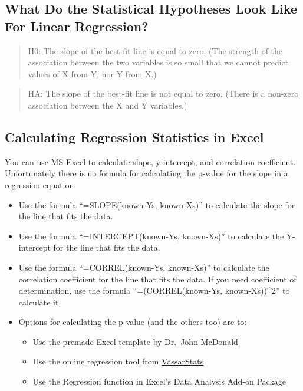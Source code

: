 \documentclass[
]{book}
\providecommand{\tightlist}{%
  \setlength{\itemsep}{0pt}\setlength{\parskip}{0pt}}
\begin{document}
\hypertarget{what-do-the-statistical-hypotheses-look-like-for-linear-regression}{%
\subsection{What Do the Statistical Hypotheses Look Like For Linear Regression?}\label{what-do-the-statistical-hypotheses-look-like-for-linear-regression}}

\begin{quote}
H0: The slope of the best-fit line is equal to zero. (The strength of the association between the two variables is so small that we cannot predict values of X from Y, nor Y from X.)
\end{quote}

\begin{quote}
HA: The slope of the best-fit line is not equal to zero. (There is a non-zero association between the X and Y variables.)
\end{quote}

\hypertarget{calculating-regression-statistics-in-excel}{%
\subsection{Calculating Regression Statistics in Excel}\label{calculating-regression-statistics-in-excel}}

You can use MS Excel to calculate slope, y-intercept, and correlation coefficient. Unfortunately there is no formula for calculating the p-value for the slope in a regression equation.

\begin{itemize}
\tightlist
\item
  Use the formula ``=SLOPE(known-Ys, known-Xs)'' to calculate the slope for the line that fits the data.
\item
  Use the formula ``=INTERCEPT(known-Ys, known-Xs)'' to calculate the Y-intercept for the line that fits the data.
\item
  Use the formula ``=CORREL(known-Ys, known-Xs)'' to calculate the correlation coefficient for the line that fits the data. If you need coefficient of determination, use the formula ``=(CORREL(known-Ys, known-Xs))\^{}2'' to calculate it.
\item
  Options for calculating the p-value (and the others too) are to:

  \begin{itemize}
  \tightlist
  \item
    Use the \href{http://www.biostathandbook.com/regression.xls}{premade Excel template by Dr.~John McDonald}
  \item
    Use the online regression tool from \href{http://vassarstats.net/corr_stats.html}{VassarStats}
  \item
    Use the Regression function in Excel's Data Analysis Add-on Package
  \end{itemize}
\end{itemize}
\end{document}
